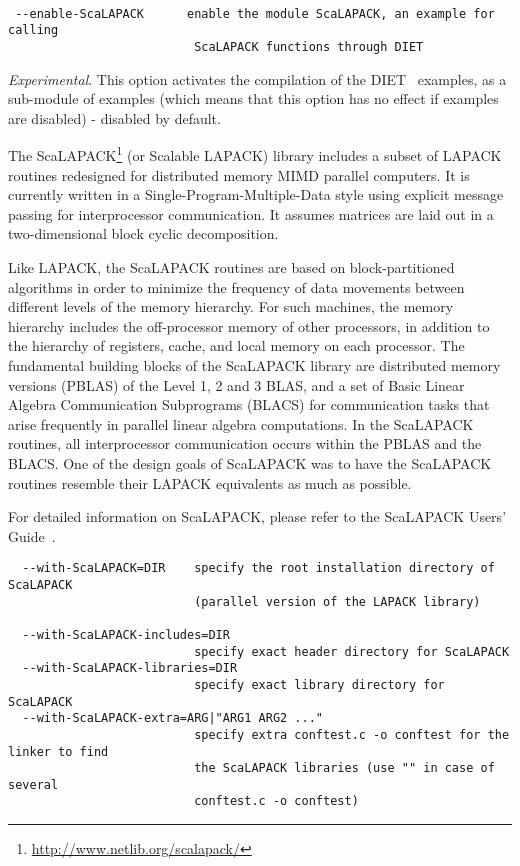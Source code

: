 \paragraph{\scalapack}

{\footnotesize
\begin{verbatim}
 --enable-ScaLAPACK      enable the module ScaLAPACK, an example for calling
                          ScaLAPACK functions through DIET
\end{verbatim}
}
\noindent \textit{Experimental}.  This option activates the
compilation of the DIET \scalapack\ examples, as a sub-module of
examples (which means that this option has no effect if examples are
disabled) - disabled by default.


The ScaLAPACK\footnote{\url{http://www.netlib.org/scalapack/}} (or
Scalable LAPACK) library includes a subset of LAPACK routines
redesigned for distributed memory MIMD parallel computers. It is
currently written in a Single-Program-Multiple-Data style using
explicit message passing for interprocessor communication. It assumes
matrices are laid out in a two-dimensional block cyclic decomposition.

Like LAPACK, the ScaLAPACK routines are based on block-partitioned
algorithms in order to minimize the frequency of data movements
between different levels of the memory hierarchy. For such machines,
the memory hierarchy includes the off-processor memory of other
processors, in addition to the hierarchy of registers, cache, and
local memory on each processor.  The fundamental building blocks of
the ScaLAPACK library are distributed memory versions (PBLAS) of the
Level 1, 2 and 3 BLAS, and a set of Basic Linear Algebra Communication
Subprograms (BLACS) for communication tasks that arise frequently in
parallel linear algebra computations. In the ScaLAPACK routines, all
interprocessor communication occurs within the PBLAS and the BLACS.
One of the design goals of ScaLAPACK was to have the ScaLAPACK
routines resemble their LAPACK equivalents as much as possible.

For detailed information on ScaLAPACK, please refer to the ScaLAPACK
Users' Guide~\cite{BCC+97}.


{\footnotesize
\begin{verbatim}
  --with-ScaLAPACK=DIR    specify the root installation directory of ScaLAPACK
                          (parallel version of the LAPACK library)

  --with-ScaLAPACK-includes=DIR
                          specify exact header directory for ScaLAPACK
  --with-ScaLAPACK-libraries=DIR
                          specify exact library directory for ScaLAPACK
  --with-ScaLAPACK-extra=ARG|"ARG1 ARG2 ..."
                          specify extra conftest.c -o conftest for the linker to find 
                          the ScaLAPACK libraries (use "" in case of several 
                          conftest.c -o conftest)
\end{verbatim}
}

